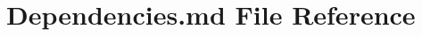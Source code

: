 \hypertarget{_dependencies_8md}{}\section{Dependencies.\+md File Reference}
\label{_dependencies_8md}
